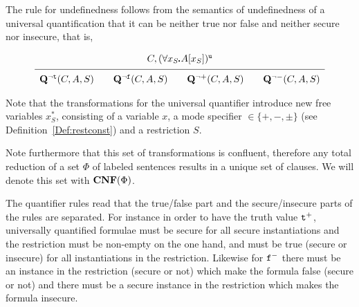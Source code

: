 \documentclass{\filespath jancl}
\def\Cnf{\hbox{\bf CNF}}               %
\def\Q{{\bf Q}}\def\R{{\bf R}}\def\S{{\bf S}}\def\T{{\bf T}}
\def\sdot{\rule{.3ex}{.3ex}\hspace{-0.4ex}\;} %
\newcommand{\true}{{\sf t}}
\newcommand{\undefined}{{\sf u}}
\newcommand{\false}{{\sf f}}
\newcommand{\twts}{{{\sf t}^+}}
\newcommand{\twfs}{{{\sf f}^+}}
\newcommand{\twti}{{{\sf t}^-}}
\newcommand{\twfi}{{{\sf f}^-}}
\newcommand{\twu}{{\sf u}}
\def\sf{\tt}
\begin{document}
\begin{definition}
The rule for undefinedness follows from the semantics of undefinedness
of a universal quantification that it can be neither true nor false
and neither secure nor insecure, that is,

\[
 \begin{array}{c}
 C,(\forall x_S\sdot A[x_S])^\twu\\[1ex]\hline
     \rule{0ex}{3ex}\Q^{\non\true}(C,A,S)\qquad\Q^{\non\false}(C,A,S)\qquad
       \Q^{\non+}(C,A,S)\qquad\Q^{\non-}(C,A,S)
  \end{array}\]
\end{definition}

Note that the transformations for the universal quantifier introduce new free
variables $x^*_S$, consisting of a variable $x$, a mode specifier $\in\{+,-,\pm\}$
(see Definition~\ref{Def:restconst}) and a restriction $S$.

Note furthermore that this set of transformations is confluent,
therefore any total reduction of a set $\Phi$ of labeled sentences
results in a unique set of clauses. We will denote this set with
$\Cnf(\Phi)$.

The quantifier rules read that the true/false part and the
secure/insecure parts of the rules are separated. For instance in
order to have the truth value $\twts$, universally quantified formulae
must be secure for all secure instantiations and the restriction must
be non-empty on the one hand, and must be true (secure or insecure)
for all instantiations in the restriction. Likewise for $\twfi$ there
must be an instance in the restriction (secure or not) which make the
formula false (secure or not) and there must be a secure instance in
the restriction which makes the formula insecure.

\end{document}
